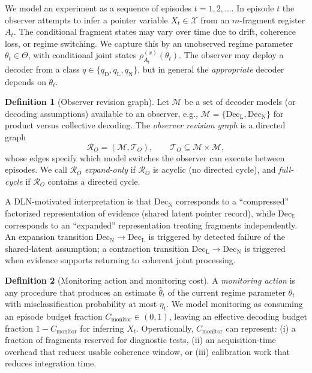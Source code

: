 \documentclass[11pt]{article}
\newcommand{\cX}{\mathcal{X}}
\newcommand{\cR}{\mathcal{R}}
\newcommand{\1}{\mathbf{1}}
\theoremstyle{definition}
\newtheorem{definition}{Definition}
\theoremstyle{plain}
\begin{document}
We model an experiment as a sequence of episodes $t=1,2,\dots$.
In episode $t$ the observer attempts to infer a pointer variable $X_t\in\cX$ from an $m$-fragment register $A_t$.
The conditional fragment states may vary over time due to drift, coherence loss, or regime switching.
We capture this by an unobserved regime parameter $\theta_t\in\Theta$, with conditional joint states
$\rho_{A_t}^{(x)}(\theta_t)$.
The observer may deploy a decoder from a class $q\in\{q_{\mathrm{D}},q_{\mathrm{L}},q_{\mathrm{N}}\}$, but in general the \emph{appropriate} decoder depends on $\theta_t$.

\begin{definition}[Observer revision graph]
\label{def:revision-graph-q}
Let $\mathcal{M}$ be a set of decoder models (or decoding assumptions) available to an observer, e.g.,
$\mathcal{M}=\{\mathrm{Dec}_{\mathrm{L}},\mathrm{Dec}_{\mathrm{N}}\}$ for product versus collective decoding.
The \emph{observer revision graph} is a directed graph
\[
\cR_O=(\mathcal{M},\mathcal{T}_O),
\qquad
\mathcal{T}_O\subseteq \mathcal{M}\times\mathcal{M},
\]
whose edges specify which model switches the observer can execute between episodes.
We call $\cR_O$ \emph{expand-only} if $\cR_O$ is acyclic (no directed cycle), and \emph{full-cycle} if $\cR_O$ contains a directed cycle.
\end{definition}

A DLN-motivated interpretation is that $\mathrm{Dec}_{\mathrm{N}}$ corresponds to a ``compressed'' factorized representation of evidence (shared latent pointer record),
while $\mathrm{Dec}_{\mathrm{L}}$ corresponds to an ``expanded'' representation treating fragments independently.
An expansion transition $\mathrm{Dec}_{\mathrm{N}}\to \mathrm{Dec}_{\mathrm{L}}$ is triggered by detected failure of the shared-latent assumption; a contraction transition $\mathrm{Dec}_{\mathrm{L}}\to \mathrm{Dec}_{\mathrm{N}}$ is triggered when evidence supports returning to coherent joint processing.

\begin{definition}[Monitoring action and monitoring cost]
\label{def:monitoring-cost}
A \emph{monitoring action} is any procedure that produces an estimate $\widehat{\theta}_t$ of the current regime parameter $\theta_t$ with misclassification probability at most $\eta_t$.
We model monitoring as consuming an episode budget fraction $C_{\mathrm{monitor}}\in(0,1)$, leaving an effective decoding budget fraction $1-C_{\mathrm{monitor}}$ for inferring $X_t$.
Operationally, $C_{\mathrm{monitor}}$ can represent: (i) a fraction of fragments reserved for diagnostic tests, (ii) an acquisition-time overhead that reduces usable coherence window, or (iii) calibration work that reduces integration time.
\end{definition}
\end{document}
